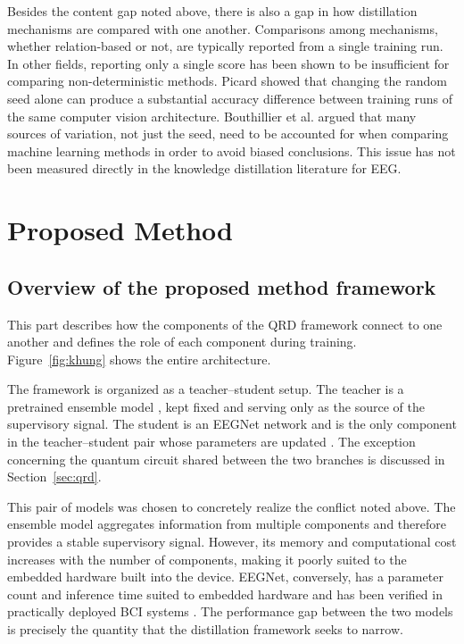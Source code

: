 Besides the content gap noted above, there is also a gap in how
distillation mechanisms are compared with one another. Comparisons
among mechanisms, whether relation-based or not, are typically
reported from a single training run. In other fields, reporting only
a single score has been shown to be insufficient for comparing
non-deterministic methods. Picard \cite{picard2021torch} showed that
changing the random seed alone can produce a substantial accuracy
difference between training runs of the same computer vision
architecture. Bouthillier et al. \cite{bouthillier2021accounting}
argued that many sources of variation, not just the seed, need to be
accounted for when comparing machine learning methods in order to
avoid biased conclusions. This issue has not been measured directly
in the knowledge distillation literature for EEG.

\section{Proposed Method}
\label{sec:phuongphap}

\subsection{Overview of the proposed method framework}

This part describes how the components of the QRD framework connect
to one another and defines the role of each component during
training. Figure~\ref{fig:khung} shows the entire architecture.

The framework is organized as a teacher--student setup. The teacher
is a pretrained ensemble model \cite{zoumpourlis2024motor}, kept
fixed and serving only as the source of the supervisory signal. The
student is an EEGNet network \cite{lawhern2018eegnet} and is the only
component in the teacher--student pair whose parameters are updated
\cite{hinton2015distilling}. The exception concerning the quantum
circuit shared between the two branches is discussed in
Section~\ref{sec:qrd}.

This pair of models was chosen to concretely realize the conflict
noted above. The ensemble model aggregates information from multiple
components and therefore provides a stable supervisory signal.
However, its memory and computational cost increases with the number
of components, making it poorly suited to the embedded hardware
built into the device. EEGNet, conversely, has a parameter count and
inference time suited to embedded hardware and has been verified in
practically deployed BCI systems \cite{wang2024mibminet}. The
performance gap between the two models is precisely the quantity
that the distillation framework seeks to narrow.

